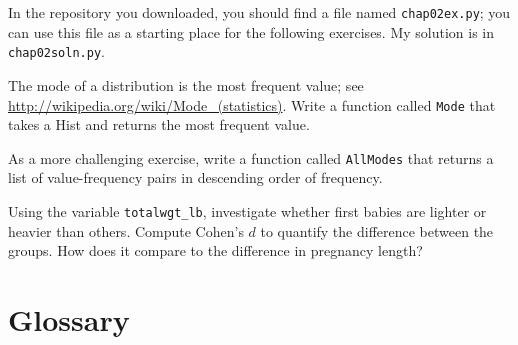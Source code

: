 \documentclass[12pt]{book}
\begin{document}
In the repository you downloaded, you should find a file named
\verb"chap02ex.py"; you can use this file as a starting place
for the following exercises.
My solution is in \verb"chap02soln.py".

\begin{exercise}
The mode of a distribution is the most frequent value; see
\url{http://wikipedia.org/wiki/Mode_(statistics)}.  Write a function
called {\tt Mode} that takes a Hist and returns the most
frequent value.

As a more challenging exercise, write a function called {\tt AllModes}
that returns a list of value-frequency pairs in descending order of
frequency.
\end{exercise}

\begin{exercise}
Using the variable \verb"totalwgt_lb", investigate whether first
babies are lighter or heavier than others.  Compute Cohen's $d$
to quantify the difference between the groups.  How does it
compare to the difference in pregnancy length?
\end{exercise}


\section{Glossary}
\end{document}
